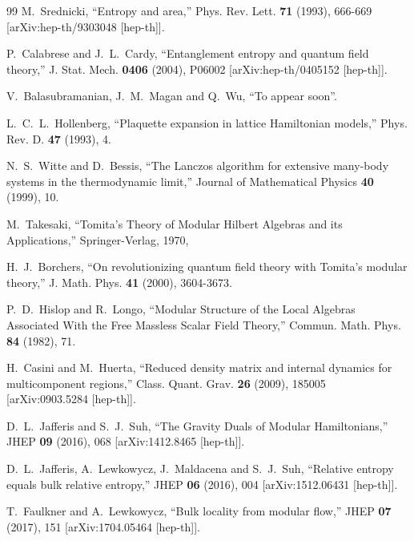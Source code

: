 \documentclass[aps,prl,twocolumn,showpacs,preprintnumbers,amsmath,amssymb]{revtex4-1}
\begin{document}
\begin{thebibliography}{99}
M.~Srednicki,
``Entropy and area,''
Phys. Rev. Lett. \textbf{71} (1993), 666-669
[arXiv:hep-th/9303048 [hep-th]].
  
P.~Calabrese and J.~L.~Cardy,
``Entanglement entropy and quantum field theory,''
J. Stat. Mech. \textbf{0406} (2004), P06002
[arXiv:hep-th/0405152 [hep-th]].
  
V.~Balasubramanian, J.~M.~Magan and Q.~Wu,
``To appear soon''.

L.~C.~L.~Hollenberg,
``Plaquette expansion in lattice Hamiltonian models,''
Phys. Rev. D. \textbf{47} (1993), 4.

N.~S.~Witte and D.~Bessis, 
``The Lanczos algorithm for extensive many-body systems in the thermodynamic limit,''
Journal of Mathematical Physics \textbf{40} (1999), 10.


M.~Takesaki,
``Tomita's Theory of Modular Hilbert Algebras and its Applications,''
Springer-Verlag, 1970,

H.~J.~Borchers,
``On revolutionizing quantum field theory with Tomita's modular theory,''
J. Math. Phys. \textbf{41} (2000), 3604-3673.

P.~D.~Hislop and R.~Longo,
``Modular Structure of the Local Algebras Associated With the Free Massless Scalar Field Theory,''
Commun. Math. Phys. \textbf{84} (1982), 71.

H.~Casini and M.~Huerta,
``Reduced density matrix and internal dynamics for multicomponent regions,''
Class. Quant. Grav. \textbf{26} (2009), 185005
[arXiv:0903.5284 [hep-th]].

D.~L.~Jafferis and S.~J.~Suh,
``The Gravity Duals of Modular Hamiltonians,''
JHEP \textbf{09} (2016), 068
[arXiv:1412.8465 [hep-th]].

D.~L.~Jafferis, A.~Lewkowycz, J.~Maldacena and S.~J.~Suh,
``Relative entropy equals bulk relative entropy,''
JHEP \textbf{06} (2016), 004
[arXiv:1512.06431 [hep-th]].

T.~Faulkner and A.~Lewkowycz,
``Bulk locality from modular flow,''
JHEP \textbf{07} (2017), 151
[arXiv:1704.05464 [hep-th]].


\end{thebibliography}
\end{document}
